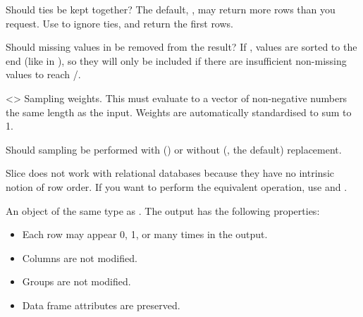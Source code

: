 \documentclass[a4paper]{book}
\begin{document}
\begin{Arguments}
\begin{ldescription}
\item[\code{with\_ties}] Should ties be kept together? The default, ,
may return more rows than you request. Use  to ignore ties,
and return the first  rows.

\item[\code{na\_rm}] Should missing values in  be removed from the result?
If ,  values are sorted to the end (like in ), so
they will only be included if there are insufficient non-missing values to
reach /.

\item[\code{weight\_by}] <> Sampling
weights. This must evaluate to a vector of non-negative numbers the same
length as the input. Weights are automatically standardised to sum to 1.

\item[\code{replace}] Should sampling be performed with () or without
(, the default) replacement.
\end{ldescription}
\end{Arguments}
%
\begin{Details}
Slice does not work with relational databases because they have no
intrinsic notion of row order. If you want to perform the equivalent
operation, use  and .
\end{Details}
%
\begin{Value}
An object of the same type as . The output has the following
properties:
\begin{itemize}

\item{} Each row may appear 0, 1, or many times in the output.
\item{} Columns are not modified.
\item{} Groups are not modified.
\item{} Data frame attributes are preserved.

\end{itemize}

\end{Value}
%
\end{document}
